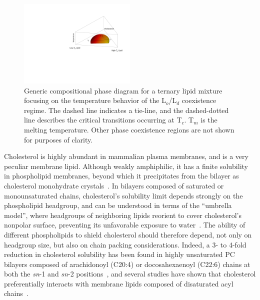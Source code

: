 \documentclass[8.5pt,twoside,twocolumn]{article}
\begin{document}
\begin{figure}
	\includegraphics[width=0.5\textwidth]{figures/phase_diagram.pdf}
	\caption{Generic compositional phase diagram for a ternary lipid mixture focusing on the temperature behavior of the L$_o$/L$_d$ coexistence regime. The dashed line indicates a tie-line, and the dashed-dotted line describes the critical transitions occurring at T$_c$. T$_m$ is the melting temperature. Other phase coexistence regions are not shown for purposes of clarity.}
	\label{phase_diagram}
\end{figure}



Cholesterol is highly abundant in mammalian plasma membranes, and is a very peculiar membrane lipid. Although weakly amphiphilic, it has a finite solubility in phospholipid membranes, beyond which it precipitates from the bilayer as cholesterol monohydrate crystals~\cite{Buboltz.1999}. In bilayers composed of saturated or monounsaturated chains, cholesterol's solubility limit depends strongly on the phospholipid headgroup, and can be understood in terms of the ``umbrella model'', where headgroups of neighboring lipids reorient to cover cholesterol's nonpolar surface, preventing its unfavorable exposure to water~\cite{JuyangHuang.1999}. The ability of different phospholipids to shield cholesterol should therefore depend, not only on headgroup size, but also on chain packing considerations. Indeed, a 3- to 4-fold reduction in cholesterol solubility has been found in highly unsaturated PC bilayers composed of arachidonoyl (C20:4) or docosahexaenoyl (C22:6) chains at both the \textit{sn}-1 and \textit{sn}-2 positions~\cite{StephenR.Wassall.2004}, and several studies have shown that cholesterol preferentially interacts with membrane lipids composed of disaturated acyl chains~\cite{Silvius.2003}.
\end{document}
